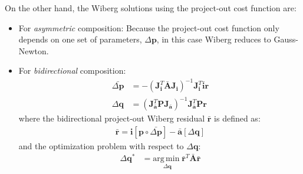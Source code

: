 On the other hand, the Wiberg solutions using the project-out cost function are:
\begin{itemize}
	\item For \emph{asymmetric} composition:
	Because the project-out cost function only depends on one set of parameters, $\Delta \mathbf{p}$, in this case Wiberg reduces to Gauss-Newton.

	\item For \emph{bidirectional} composition:
	\begin{equation}
	    \begin{aligned}
	    	\bar{\Delta \mathbf{p}} & = - \left( \mathbf{J}_\mathbf{i}^T \bar{\mathbf{A}} \mathbf{J}_\mathbf{i} \right)^{-1} \mathbf{J}_\mathbf{i}^T \bar{\mathbf{i}} \mathbf{r}
	    	\\
	        \Delta \mathbf{q} & = \left( \mathbf{J}_{\bar{\mathbf{a}}}^T \mathbf{P} \mathbf{J}_{\bar{\mathbf{a}}} \right)^{-1} \mathbf{J}_{\bar{\mathbf{a}}}^T \mathbf{P} \mathbf{r}
	    \label{eq:bidirectional_wiberg_po_solution}
	    \end{aligned}
	\end{equation}
	where the bidirectional project-out Wiberg residual $\bar{\mathbf{r}}$ is defined as:
	\begin{equation}
	    \begin{aligned}
	        \bar{\mathbf{r}} = \mathbf{i}[\mathbf{p} \circ \bar{\Delta\mathbf{p}}] - \bar{\mathbf{a}}[\Delta\mathbf{q}]
	    \label{eq:po_wiberg_residual}
	    \end{aligned}
	\end{equation}
	and the optimization problem with respect to $\Delta\mathbf{q}$: 
	\begin{equation}
	    \begin{aligned}
	        \Delta\mathbf{q}^* & = \underset{\Delta\mathbf{q}}{\mathrm{arg\,min\;}} \bar{\mathbf{r}}^T\bar{\mathbf{A}}\bar{\mathbf{r}}
	    \label{eq:bidirectional_wiberg_problem1}
	    \end{aligned}
	\end{equation}
\end{itemize}
